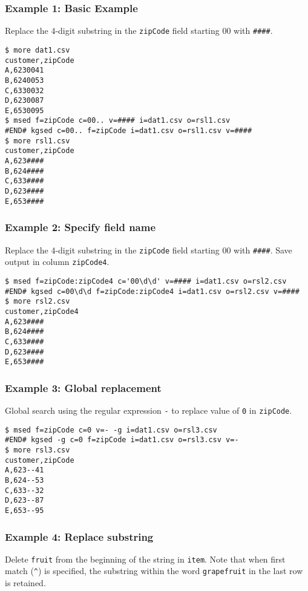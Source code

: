 \subsubsection*{Example 1: Basic Example}

Replace the 4-digit substring in the \verb|zipCode| field starting 00 with \verb|####|.


\begin{Verbatim}[baselinestretch=0.7,frame=single]
$ more dat1.csv
customer,zipCode
A,6230041
B,6240053
C,6330032
D,6230087
E,6530095
$ msed f=zipCode c=00.. v=#### i=dat1.csv o=rsl1.csv
#END# kgsed c=00.. f=zipCode i=dat1.csv o=rsl1.csv v=####
$ more rsl1.csv
customer,zipCode
A,623####
B,624####
C,633####
D,623####
E,653####
\end{Verbatim}
\subsubsection*{Example 2: Specify field name}

Replace the 4-digit substring in the \verb|zipCode| field starting 00 with \verb|####|. Save output in column \verb|zipCode4|.


\begin{Verbatim}[baselinestretch=0.7,frame=single]
$ msed f=zipCode:zipCode4 c='00\d\d' v=#### i=dat1.csv o=rsl2.csv
#END# kgsed c=00\d\d f=zipCode:zipCode4 i=dat1.csv o=rsl2.csv v=####
$ more rsl2.csv
customer,zipCode4
A,623####
B,624####
C,633####
D,623####
E,653####
\end{Verbatim}
\subsubsection*{Example 3: Global replacement}

Global search using the regular expression \verb|-| to replace value of \verb|0| in \verb|zipCode|.


\begin{Verbatim}[baselinestretch=0.7,frame=single]
$ msed f=zipCode c=0 v=- -g i=dat1.csv o=rsl3.csv
#END# kgsed -g c=0 f=zipCode i=dat1.csv o=rsl3.csv v=-
$ more rsl3.csv
customer,zipCode
A,623--41
B,624--53
C,633--32
D,623--87
E,653--95
\end{Verbatim}
\subsubsection*{Example 4: Replace substring}

Delete \verb|fruit| from the beginning of the string in \verb|item|. Note that when first match (\verb|^|) is specified, the substring within the word \verb|grapefruit| in the last row is retained.



